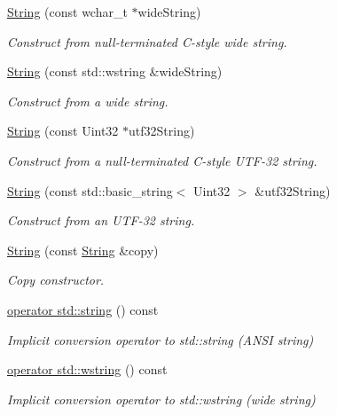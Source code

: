 \begin{DoxyCompactItemize}
\hyperlink{classsf_1_1_string_a5742d0a9b0c754f711820c2b5c40fa55}{String} (const wchar\+\_\+t $\ast$wide\+String)
\begin{DoxyCompactList}\small\item\em Construct from null-\/terminated C-\/style wide string. \end{DoxyCompactList}\item 
\hyperlink{classsf_1_1_string_a5e38151340af4f9a5f74ad24c0664074}{String} (const std\+::wstring \&wide\+String)
\begin{DoxyCompactList}\small\item\em Construct from a wide string. \end{DoxyCompactList}\item 
\hyperlink{classsf_1_1_string_aea3629adf19f9fe713d4946f6c75b214}{String} (const Uint32 $\ast$utf32\+String)
\begin{DoxyCompactList}\small\item\em Construct from a null-\/terminated C-\/style U\+T\+F-\/32 string. \end{DoxyCompactList}\item 
\hyperlink{classsf_1_1_string_a6eee86dbe75d16bbcc26e97416c2e1ca}{String} (const std\+::basic\+\_\+string$<$ Uint32 $>$ \&utf32\+String)
\begin{DoxyCompactList}\small\item\em Construct from an U\+T\+F-\/32 string. \end{DoxyCompactList}\item 
\hyperlink{classsf_1_1_string_af862594d3c4070d8ddbf08cf8dce4f59}{String} (const \hyperlink{classsf_1_1_string}{String} \&copy)
\begin{DoxyCompactList}\small\item\em Copy constructor. \end{DoxyCompactList}\item 
\hyperlink{classsf_1_1_string_a884816a0f688cfd48f9324c9741dc257}{operator std\+::string} () const
\begin{DoxyCompactList}\small\item\em Implicit conversion operator to std\+::string (A\+N\+SI string) \end{DoxyCompactList}\item 
\hyperlink{classsf_1_1_string_a6bd1444bebaca9bbf01ba203061f5076}{operator std\+::wstring} () const
\begin{DoxyCompactList}\small\item\em Implicit conversion operator to std\+::wstring (wide string) \end{DoxyCompactList}\item 

\end{DoxyCompactItemize}
